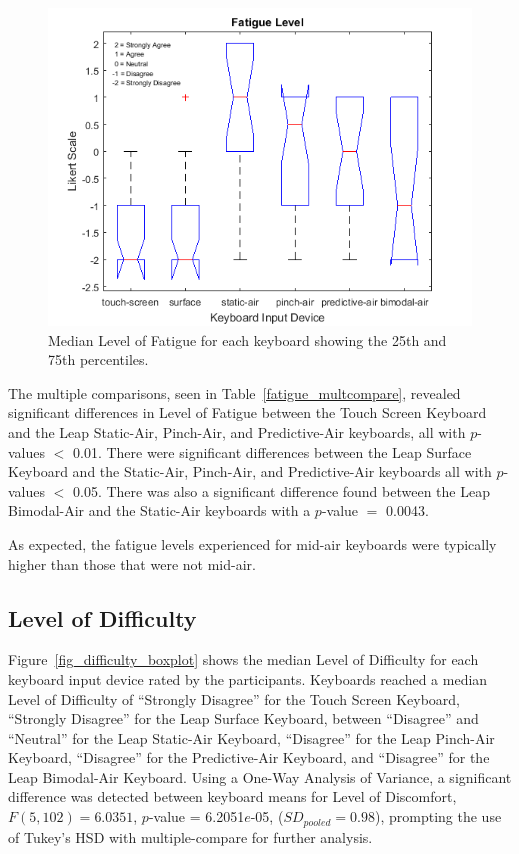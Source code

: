 \begin{figure}[h]
	\centering
	\includegraphics{fig_fatigue_boxplot}
	\caption[Level of Fatigue Boxplot]{Median Level of Fatigue for each keyboard showing the 25th and 75th percentiles.}
	\label{fig_fatigue_boxplot}
\end{figure}

The multiple comparisons, seen in Table~\ref{fatigue_multcompare}, revealed significant differences in Level of Fatigue between the Touch Screen Keyboard and the Leap Static-Air, Pinch-Air, and Predictive-Air keyboards, all with $p$-values $<$ 0.01. There were significant differences between the Leap Surface Keyboard and the Static-Air, Pinch-Air, and Predictive-Air keyboards all with $p$-values $<$ 0.05. There was also a significant difference found between the Leap Bimodal-Air and the Static-Air keyboards with a $p$-value $=$ 0.0043.

As expected, the fatigue levels experienced for mid-air keyboards were typically higher than those that were not mid-air.

\subsection{Level of Difficulty}
Figure~\ref{fig_difficulty_boxplot} shows the median Level of Difficulty for each keyboard input device rated by the participants. Keyboards reached a median Level of Difficulty of ``Strongly Disagree'' for the Touch Screen Keyboard, ``Strongly Disagree'' for the Leap Surface Keyboard, between ``Disagree'' and ``Neutral'' for the Leap Static-Air Keyboard, ``Disagree'' for the Leap Pinch-Air Keyboard, ``Disagree'' for the Predictive-Air Keyboard, and ``Disagree'' for the Leap Bimodal-Air Keyboard. Using a One-Way Analysis of Variance, a significant difference was detected between keyboard means for Level of Discomfort, $F(5, 102) = 6.0351$, $p$-value = 6.2051$e$-05, ($SD_{pooled} = 0.98$), prompting the use of Tukey's HSD with multiple-compare for further analysis.

